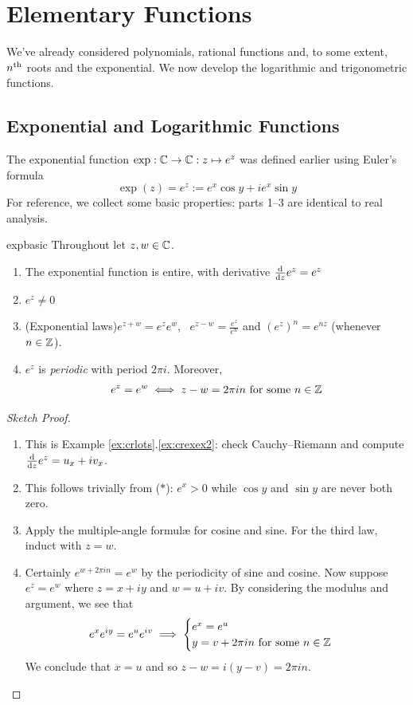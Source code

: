 \graphicspath{{3functions/asy/}}


\section{Elementary Functions}\label{chap:functions}

We've already considered polynomials, rational functions and, to some extent, $n\textsuperscript{th}$ roots and the exponential. We now develop the logarithmic and trigonometric functions.

\subsection[Exponentials \& Logarithms]{Exponential and Logarithmic Functions}%

The exponential function $\exp:\mathbb{C}\to\mathbb{C}:z\mapsto e^z$ was defined earlier using Euler's formula
\[
	\exp(z)=e^z:=e^x\cos y+ie^x\sin y \tag{$\ast$}
\]
For reference, we collect some basic properties: parts 1--3 are identical to real analysis.

\begin{lemm}{}{expbasic}
	Throughout let $z,w\in\mathbb{C}$.
	\begin{enumerate}\itemsep1pt
	  \item The exponential function is entire, with derivative $\frac{\mathrm{d} }{\mathrm{d} z}e^z=e^z$
	  \item $e^z\neq 0$
	  \item\label{lemmpart:exp4} (Exponential laws)\lstsp $e^{z+w}=e^{z}e^{w}$, \  $e^{z-w}=\frac{e^{z}}{e^{w}}$ and $(e^z)^n=e^{nz}$ (whenever $n\in\mathbb{Z}$).
	  \item\label{lemmpart:exp5} $e^z$ is \emph{periodic} with period $2\pi i$. Moreover,
	  \[
	  	e^z=e^w\iff z-w=2\pi in\text{ for some }n\in\mathbb{Z}
	  \]
	\end{enumerate}
\end{lemm}

\begin{proof}[Sketch Proof]
	\begin{enumerate}\itemsep1pt
	  \item This is Example \ref*{ex:crlots}.\ref{ex:crexex2}: check Cauchy--Riemann and compute $\frac{\mathrm{d} }{\mathrm{d} z}e^z=u_x+iv_x$.
	  \item This follows trivially from ($\ast$): $e^x>0$ while $\cos y$ and $\sin y$ are never both zero.
	  \item Apply the multiple-angle formulæ for cosine and sine. For the third law, induct with $z=w$.
		\item Certainly $e^{w+2\pi in}=e^w$ by the periodicity of sine and cosine. Now suppose $e^z=e^w$ where $z=x+iy$ and $w=u+iv$. By considering the modulus and argument, we see that
		\[
			e^xe^{iy}=e^ue^{iv}\implies
			\begin{cases}
				e^x=e^u\\
				y=v+2\pi in\text{ for some }n\in\mathbb{Z}
			\end{cases}
		\]
		We conclude that $x=u$ and so $z-w=i(y-v)=2\pi in$.\qedhere
	\end{enumerate}
\end{proof}

